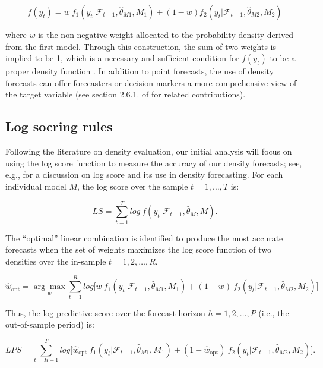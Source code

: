 \documentclass{monashthesis}
\begin{document}
\begin{equation}
\label{eqn:LC1}
f(y_t) = w \ f_1(y_t | \mathcal{F}_{t-1}, \hat\theta_{M1}, M_1) + (1-w) f_2(y_t | \mathcal{F}_{t-1}, \hat\theta_{M2}, M_2)
\end{equation}

where \(w\) is the non-negative weight allocated to the probability density derived from the first model. Through this construction, the sum of two weights is implied to be 1, which is a necessary and sufficient condition for \(f(y_t)\) to be a proper density function \autocite{GA11}. In addition to point forecasts, the use of density forecasts can offer forecasters or decision markers a more comprehensive view of the target variable (see section 2.6.1. of \textcite{FTP22} for related contributions).

\hypertarget{log-socring-rules}{%
\subsection{Log socring rules}\label{log-socring-rules}}

Following the literature on density evaluation, our initial analysis will focus on using the log score function to measure the accuracy of our density forecasts; see, e.g., \textcite{GA11} for a discussion on log score and its use in density forecasting. For each individual model \(M\), the log score over the sample \(t = 1, \dots, T\) is:

\begin{equation}
\label{eqn:LS1}
LS = \sum^T_{t=1} log \ f(y_t| \mathcal{F}_{t-1}, \hat\theta_M, M).
\end{equation}

The ``optimal'' linear combination is identified to produce the most accurate forecasts when the set of weights maximizes the log score function of two densities over the in-sample \(t = 1, 2, \dots, R\).

\begin{equation}
\label{eqn:LS2}
\hat{w}_{\text{opt}} = \underset{w}{\arg\max} \sum^R_{t=1} log \Big[ w \ f_1(y_t| \mathcal{F}_{t-1}, \hat\theta_{M1}, M_1) + (1-w) \ f_2(y_t| \mathcal{F}_{t-1}, \hat\theta_{M2}, M_2)\Big]
\end{equation}

Thus, the log predictive score over the forecast horizon \(h = 1, 2, \dots, P\) (i.e., the out-of-sample period) is:

\begin{equation}
\label{eqn:LS3}
LPS = \sum^T_{t = R+1} log \Big[ \hat{w}_{\text{opt}} \ f_1(y_t| \mathcal{F}_{t-1}, \hat\theta_{M1}, M_1) + (1- \hat{w}_{\text{opt}}) \ f_2(y_t| \mathcal{F}_{t-1}, \hat\theta_{M2}, M_2)\Big].
\end{equation}
\end{document}
